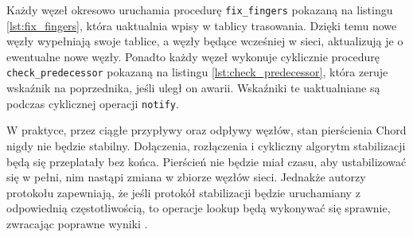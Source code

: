 \documentclass[12pt, twoside, openany]{report}
\begin{document}












Każdy węzeł okresowo uruchamia procedurę \texttt{fix\_fingers} pokazaną na listingu \ref{lst:fix_fingers}, która uaktualnia wpisy w tablicy trasowania. Dzięki temu nowe węzły wypełniają swoje tablice, a węzły będące wcześniej w sieci, aktualizują je o ewentualne nowe węzły. Ponadto każdy węzeł wykonuje cyklicznie procedurę \\\texttt{check\_predecessor} pokazaną na listingu \ref{lst:check_predecessor}, która zeruje wskaźnik na poprzednika, jeśli uległ on awarii. Wskaźniki te uaktualniane są podczas cyklicznej operacji \texttt{notify}.

W praktyce, przez ciągłe przypływy oraz odpływy węzłów, stan pierścienia Chord nigdy nie będzie stabilny. Dołączenia, rozłączenia i cykliczny algorytm stabilizacji będą się przeplatały bez końca. Pierścień nie będzie miał czasu, aby ustabilizować się w pełni, nim nastąpi zmiana w zbiorze węzłów sieci. Jednakże autorzy protokołu zapewniają, że jeśli protokół stabilizacji będzie uruchamiany z odpowiednią częstotliwością, to operacje lookup będą wykonywać się sprawnie, zwracając poprawne wyniki \cite{bib:chord}.
\end{document}
